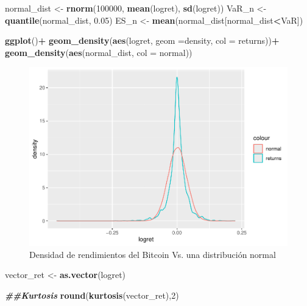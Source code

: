 \documentclass[
]{book}
\newenvironment{Shaded}{\begin{snugshade}}{\end{snugshade}}
\newcommand{\AttributeTok}[1]{\textcolor[rgb]{0.13,0.29,0.53}{#1}}
\newcommand{\DecValTok}[1]{\textcolor[rgb]{0.00,0.00,0.81}{#1}}
\newcommand{\DocumentationTok}[1]{\textcolor[rgb]{0.56,0.35,0.01}{\textbf{\textit{#1}}}}
\newcommand{\FloatTok}[1]{\textcolor[rgb]{0.00,0.00,0.81}{#1}}
\newcommand{\FunctionTok}[1]{\textcolor[rgb]{0.13,0.29,0.53}{\textbf{#1}}}
\newcommand{\NormalTok}[1]{#1}
\newcommand{\OtherTok}[1]{\textcolor[rgb]{0.56,0.35,0.01}{#1}}
\newcommand{\SpecialCharTok}[1]{\textcolor[rgb]{0.81,0.36,0.00}{\textbf{#1}}}
\newcommand{\StringTok}[1]{\textcolor[rgb]{0.31,0.60,0.02}{#1}}
\begin{document}
\begin{Shaded}
\begin{Highlighting}[]
\NormalTok{normal\_dist }\OtherTok{\textless{}{-}} \FunctionTok{rnorm}\NormalTok{(}\DecValTok{100000}\NormalTok{, }\FunctionTok{mean}\NormalTok{(logret), }\FunctionTok{sd}\NormalTok{(logret))}
\NormalTok{VaR\_n }\OtherTok{\textless{}{-}} \FunctionTok{quantile}\NormalTok{(normal\_dist, }\FloatTok{0.05}\NormalTok{)}
\NormalTok{ES\_n }\OtherTok{\textless{}{-}} \FunctionTok{mean}\NormalTok{(normal\_dist[normal\_dist}\SpecialCharTok{\textless{}}\NormalTok{VaR])}
  
\FunctionTok{ggplot}\NormalTok{()}\SpecialCharTok{+}
  \FunctionTok{geom\_density}\NormalTok{(}\FunctionTok{aes}\NormalTok{(logret, }\AttributeTok{geom =}\StringTok{\textquotesingle{}density\textquotesingle{}}\NormalTok{, }\AttributeTok{col =} \StringTok{\textquotesingle{}returns\textquotesingle{}}\NormalTok{))}\SpecialCharTok{+}
  \FunctionTok{geom\_density}\NormalTok{(}\FunctionTok{aes}\NormalTok{(normal\_dist, }\AttributeTok{col =} \StringTok{\textquotesingle{}normal\textquotesingle{}}\NormalTok{))}
\end{Highlighting}
\end{Shaded}

\begin{figure}

{\centering \includegraphics{Notas-Series-Tiempo_files/figure-latex/fig104-1} 

}

\caption{Densidad de rendimientos del Bitcoin Vs. una distribución normal}\label{fig:fig104}
\end{figure}

\begin{Shaded}
\begin{Highlighting}[]
\NormalTok{vector\_ret }\OtherTok{\textless{}{-}} \FunctionTok{as.vector}\NormalTok{(logret)}

\DocumentationTok{\#\#Kurtosis}
\FunctionTok{round}\NormalTok{(}\FunctionTok{kurtosis}\NormalTok{(vector\_ret),}\DecValTok{2}\NormalTok{)}
\end{Highlighting}
\end{Shaded}
\end{document}

